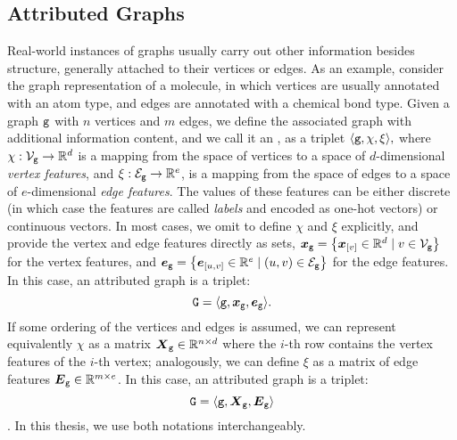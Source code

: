 \subsection{Attributed Graphs} \label{sec:attr-graphs}
Real-world instances of graphs usually carry out other information besides structure, generally attached to their vertices or edges. As an example, consider the graph representation of a molecule, in which vertices are usually annotated with an atom type, and edges are annotated with a chemical bond type. Given a graph $\mathtt{g}$ with $n$ vertices and $m$ edges, we define the associated graph with additional information content, and we call it an , as a triplet $\langle \mathtt{g}, \chi, \xi \rangle,$ where $\chi: \Nodes{g} \rightarrow \Real^d$ is a mapping from the space of vertices to a space of $d$-dimensional \emph{vertex features}, and $\xi: \Edges{g}\rightarrow \Real^{e}$, is a mapping from the space of edges to a space of $e$-dimensional \emph{edge features}. The values of these features can be either discrete (in which case the features are called \emph{labels} and encoded as one-hot vectors) or continuous vectors. In most cases, we omit to define $\chi$ and $\xi$ explicitly, and provide the vertex and edge features directly as sets, \eg $\Vector{x}_{\Graph{g}}= \Set{\Elem{x}{v} \in \Real^d \mid v \in \Nodes{g}}$ for the vertex features, and $\Vector{e}_{\Graph{g}} = \Set{\Elem{e}{u,v} \in \Real^e \mid (u, v) \in \Edges{g}}$ for the edge features. In this case, an attributed graph is a triplet:
$$\AttrGraph{g} = \VectorGraph{x}{g}.$$
If some ordering of the vertices and edges is assumed, we can represent equivalently $\chi$ as a matrix $\Matrix{X}_{\Graph{g}} \in \Real^{n \times d}$ where the $i$-th row contains the vertex features of the $i$-th vertex; analogously, we can define $\xi$ as a matrix of edge features $\Matrix{E}_{\Graph{g}} \in \Real^{m \times e}$. In this case, an attributed graph is a triplet:
$$\AttrGraph{g} = \MatrixGraph{x}{g}$$. In this thesis, we use both notations interchangeably.

